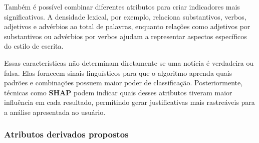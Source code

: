 \documentclass[
  brazilian,
  11pt,
]{article}
\begin{document}
Também é possível combinar diferentes atributos para criar indicadores mais significativos. A densidade lexical, por exemplo, relaciona substantivos, verbos, adjetivos e advérbios ao total de palavras, enquanto relações como adjetivos por substantivos ou advérbios por verbos ajudam a representar aspectos específicos do estilo de escrita.

Essas características não determinam diretamente se uma notícia é verdadeira ou falsa. Elas fornecem sinais linguísticos para que o algoritmo aprenda quais padrões e combinações possuem maior poder de classificação. Posteriormente, técnicas como \textbf{SHAP} podem indicar quais desses atributos tiveram maior influência em cada resultado, permitindo gerar justificativas mais rastreáveis para a análise apresentada ao usuário.

\subsubsection{\texorpdfstring{\textbf{Atributos derivados propostos}}{Atributos derivados propostos}}\label{atributos-derivados-propostos}
\end{document}

